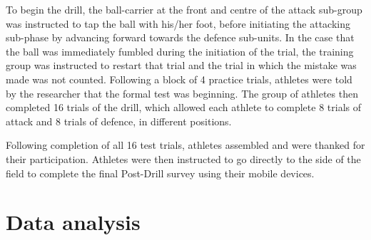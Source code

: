 \begin{CJK}{UTF8}{gbsn}
To begin the drill, the ball-carrier at the front and centre of the attack sub-group was instructed to tap the ball with his/her foot, before initiating the attacking sub-phase by advancing forward towards the defence sub-units.  In the case that the ball was immediately fumbled during the initiation of the trial, the training group was instructed to restart that trial and the trial in which the mistake was made was not counted.  Following a block of 4 practice trials, athletes were told by the researcher that the formal test was beginning.  The group of athletes then completed 16 trials of the drill, which allowed each athlete to complete 8 trials of attack and 8 trials of defence, in different positions.

Following completion of all 16 test trials, athletes assembled and were thanked for their participation.  Athletes were then instructed to go directly to the side of the field to complete the final Post-Drill survey using their mobile devices.




\clearpage
\section{Data analysis}



\end{CJK}
